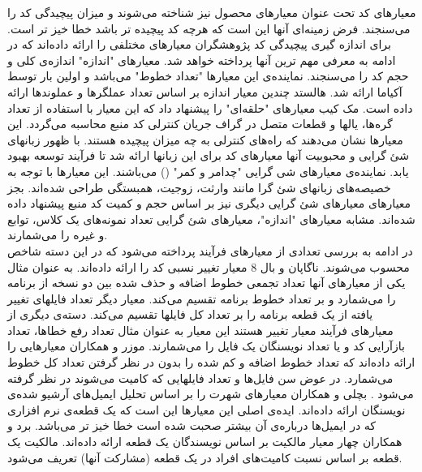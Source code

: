 معیارهای کد تحت عنوان معیارهای محصول
نیز شناخته می‌شوند و میزان پیچیدگی کد را می‌سنجند. فرض زمینه‌ای آنها این است که هرچه کد پیچیده تر باشد خطا خیز تر است. برای اندازه گیری پیچیدگی کد پژوهشگران معیار‌های مختلفی را ارائه داده‌اند که در ادامه به معرفی مهم ترین آنها پرداخته خواهد شد. معیارهای "اندازه" اندازه‌ی کلی و حجم کد را می‌سنجند. نماینده‌ی این معیارها "تعداد خطوط" می‌باشد و اولین بار توسط آکیاما  \cite{akiyama1971example}  ارائه شد. هالستد  \cite{halstead1977elements} چندین معیار اندازه بر اساس  تعداد عملگرها و عملوند‌ها ارائه داده است. مک کیب معیارهای "حلقه‌ای" 
را پیشنهاد داد که این معیار با استفاده از تعداد گره‌ها، یالها و قطعات متصل در گراف جریان کنترلی  کد منبع محاسبه می‌گردد\cite{mccabe1976complexity}. این معیارها نشان می‌دهند که راه‌های کنترلی به چه میزان پیچیده هستند. با ظهور زبانهای شئ گرایی و محبوبیت آنها معیارهای کد  برای این زبانها ارائه شد تا فرآیند توسعه بهبود یابد. نماینده‌ی معیارهای شی گرایی "چدامر و کمر" () می‌باشند\cite{chidamber1994metrics}. این معیارها با توجه به خصیصه‌های زبانهای شئ گرا مانند وارثت، زوجیت، همبستگی طراحی شده‌اند. بجز معیارهای  معیارهای شئ گرایی دیگری نیز بر اساس حجم و کمیت کد منبع پیشنهاد داده شده‌اند. مشابه معیارهای "اندازه"، معیارهای شئ گرایی تعداد نمونه‌های یک کلاس، توابع و غیره را می‌شمارند. \\
در ادامه به بررسی تعدادی از معیارهای فرآیند پرداخته می‌شود که در این دسته شاخص محسوب می‌شوند. ناگاپان و بال 8 معیار تغییر نسبی کد را ارائه داده‌اند\cite{nagappan2005use}. به عنوان مثال یکی از معیار‌های آنها تعداد تجمعی خطوط اضافه و حذف شده بین دو نسخه از برنامه را می‌شمارد و بر تعداد خطوط برنامه تقسیم می‌کند. معیار دیگر تعداد فایلهای تغییر یافته از یک قطعه برنامه را بر تعداد  کل فایلها تقسیم می‌کند. دسته‌ی دیگری از معیارهای فرآیند معیار تغییر هستند این معیار به عنوان مثال تعداد رفع خطاها، تعداد بازآرایی کد  و یا تعداد نویسنگان یک فایل را می‌شمارند. موزر و همکاران معیارهایی را ارائه داده‌اند که تعداد خطوط اضافه و کم شده را بدون در نظر گرفتن تعداد کل خطوط می‌شمارد. در عوض سن فایل‌ها و تعداد فایلهایی که کامیت می‌شوند در نظر گرفته می‌شود \cite{moser2008comparative}.  بچلی و همکاران معیارهای شهرت را بر اساس تحلیل ایمیل‌های آرشیو شده‌ی نویسنگان ارائه داده‌اند. ایده‌ی اصلی این معیارها این است که یک قطعه‌ی  نرم افزاری که در ایمیل‌ها درباره‌ی آن بیشتر صحبت شده است خطا خیز تر می‌باشد\cite{bacchelli2010popular}. برد و همکاران چهار معیار مالکیت بر اساس نویسندگان یک قطعه ارائه داده‌اند. مالکیت یک قطعه بر اساس نسبت کامیت‌های  افراد  در یک قطعه (مشارکت آنها) تعریف می‌شود. \\

